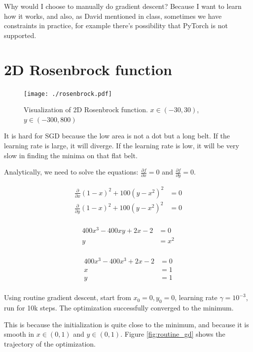 Why would I choose to manually do gradient descent?
Because I want to learn how it works, and also, as David mentioned in class, sometimes we have constraints in practice, for example there's possibility that PyTorch is not supported.

\newpage
\section{2D Rosenbrock function}
\begin{figure}[h]
    \texttt{[image: ./rosenbrock.pdf]}
    \caption{Visualization of 2D Rosenbrock function. $x \in (-30,30)$, $y \in (-300,800)$}
\end{figure}

It is hard for SGD because the low area is not a dot but a long belt.
If the learning rate is large, it will diverge.
If the learning rate is low, it will be very slow in finding the minima on that flat belt.

Analytically, we need to solve the equations: $\frac{\partial f}{\partial x} = 0$ and $\frac{\partial f}{\partial y} = 0$.

\begin{align*}[left = \empheqlbrace]
    \frac{\partial}{\partial x} (1-x)^2+100(y-x^2)^2 &= 0\\
    \frac{\partial}{\partial y} (1-x)^2+100(y-x^2)^2 &= 0\\
\end{align*}

\begin{align*}[left = \empheqlbrace]
    400x^3-400xy+2x-2 &= 0\\
    y&=x^2\\
\end{align*}

\begin{align*}
    400x^3-400x^3+2x-2 &= 0\\
    x&=1\\
    y&=1\\
\end{align*}

Using routine gradient descent, start from $x_0=0, y_0=0$, learning rate $\gamma=10^{-3}$, run for 10k steps.
The optimization successfully converged to the minimum.

This is because the initialization is quite close to the minimum,
and because it is smooth in $x \in (0,1)$ and $ y \in (0,1)$.
Figure \ref{fig:routine_gd} shows the trajectory of the optimization.

